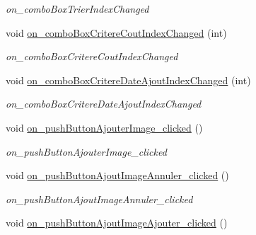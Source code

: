 \begin{DoxyCompactItemize}
\begin{DoxyCompactList}\small\item\em on\+\_\+combo\+Box\+Trier\+Index\+Changed \end{DoxyCompactList}\item 
\mbox{\label{classAppMainWindow_aa3aa7020d15253d302bab9b173c39292}} 
void \hyperlink{classAppMainWindow_aa3aa7020d15253d302bab9b173c39292}{on\+\_\+combo\+Box\+Critere\+Cout\+Index\+Changed} (int)
\begin{DoxyCompactList}\small\item\em on\+\_\+combo\+Box\+Critere\+Cout\+Index\+Changed \end{DoxyCompactList}\item 
\mbox{\label{classAppMainWindow_ad9bea95541f32cc85642a4f0434cc2c0}} 
void \hyperlink{classAppMainWindow_ad9bea95541f32cc85642a4f0434cc2c0}{on\+\_\+combo\+Box\+Critere\+Date\+Ajout\+Index\+Changed} (int)
\begin{DoxyCompactList}\small\item\em on\+\_\+combo\+Box\+Critere\+Date\+Ajout\+Index\+Changed \end{DoxyCompactList}\item 
\mbox{\label{classAppMainWindow_a3d480e06ffddc52d13b6f59364edf4d6}} 
void \hyperlink{classAppMainWindow_a3d480e06ffddc52d13b6f59364edf4d6}{on\+\_\+push\+Button\+Ajouter\+Image\+\_\+clicked} ()
\begin{DoxyCompactList}\small\item\em on\+\_\+push\+Button\+Ajouter\+Image\+\_\+clicked \end{DoxyCompactList}\item 
\mbox{\label{classAppMainWindow_a8213943a9db983045e1f250c4ae24409}} 
void \hyperlink{classAppMainWindow_a8213943a9db983045e1f250c4ae24409}{on\+\_\+push\+Button\+Ajout\+Image\+Annuler\+\_\+clicked} ()
\begin{DoxyCompactList}\small\item\em on\+\_\+push\+Button\+Ajout\+Image\+Annuler\+\_\+clicked \end{DoxyCompactList}\item 
\mbox{\label{classAppMainWindow_a3615ac5567a585a4dcee7966bf06c6ae}} 
void \hyperlink{classAppMainWindow_a3615ac5567a585a4dcee7966bf06c6ae}{on\+\_\+push\+Button\+Ajout\+Image\+Ajouter\+\_\+clicked} ()

\end{DoxyCompactItemize}
